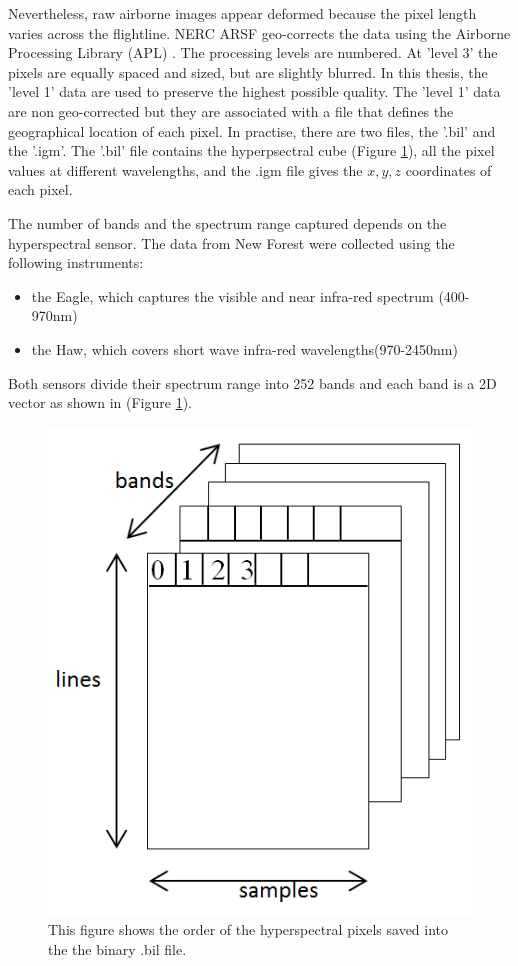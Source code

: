 \documentclass{subfiles}
\begin{document}
	\par Nevertheless, raw airborne images  appear deformed because the pixel length varies across the flightline. NERC ARSF geo-corrects the data using the Airborne Processing Library (APL) \cite{Warren2014}. The processing levels are numbered. At 'level 3' the pixels are equally spaced and sized, but are slightly blurred. In this thesis, the 'level 1' data are used to preserve the highest possible quality. The 'level 1' data are non geo-corrected but they are associated with a file that defines the geographical location of each pixel. In practise, there are two files, the '.bil' and the '.igm'. The '.bil' file contains the hyperpsectral cube (Figure \ref{fig:hyperspectralCube}), all the pixel values at different wavelengths, and the .igm file gives the $x, y, z$ coordinates of each pixel.  
	
	\par The number of bands and the spectrum range captured depends on the hyperspectral sensor. The data from New Forest were collected using the following instruments:
	\begin{itemize}
		\item the Eagle, which captures the visible and near infra-red spectrum (400-970nm)
		\item the Haw, which covers short wave infra-red wavelengths(970-2450nm) 
	\end{itemize}
	Both sensors divide their spectrum range into 252 bands and each band is a 2D vector as shown in (Figure \ref{fig:hyperspectralCube}).
	
	\begin{figure}[!htbp]
		\centering
		\includegraphics[width=\textwidth/5*2]{img/HI_bilFile}
		\caption[Hyperpsectral Cube]{This figure shows the order of the hyperspectral pixels saved into the the binary .bil file.}
		\label{fig:hyperspectralCube}
	\end{figure}
	
\end{document}
